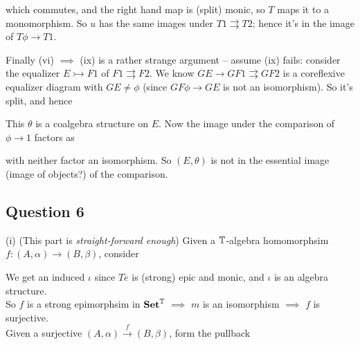 \documentclass[a4paper]{article}
\begin{document}
which commutes, and the right hand map is (split) monic, so $T$ maps it to a monomorphism. So $u$ has the same images under $T1 \rightrightarrows T2$; hence it's in the image of $T\phi \to T1$.

Finally (vi) $\implies$ (ix) is a rather strange argument -- assume (ix) fails: consider the equalizer $E \rightarrowtail F1$ of $F1 \rightrightarrows F2$. We know $GE \to GF1 \rightrightarrows GF2$ is a coreflexive equalizer diagram with $GE \neq \phi$ (since $GF\phi \to GE$ is not an isomorphism). So it's split, and hence 


This $\theta$ is a coalgebra structure on $E$. Now the image under the comparison of $\phi \to 1$ factors as
with neither factor an isomorphism. So $(E,\theta)$ is not in the essential image (image of objects?) of the comparison.

\subsection{Question 6}
(i) (This part is \emph{straight-forward enough}) Given a $\mathbb{T}$-algebra homomorphsim $f:(A,\alpha) \to (B,\beta)$, consider


We get an induced $\iota$ since $Te$ is (strong) epic and monic, and $\iota$ is an algebra structure.\\
So $f$ is a strong epimorphsim in $\mathbf{Set}^{\mathbb{T}}$ $\implies$ $m$ is an isomorphism $\implies$ $f$ is surjective.\\
Given a surjective $(A,\alpha) \xrightarrow{f} (B,\beta)$, form the pullback
\end{document}
